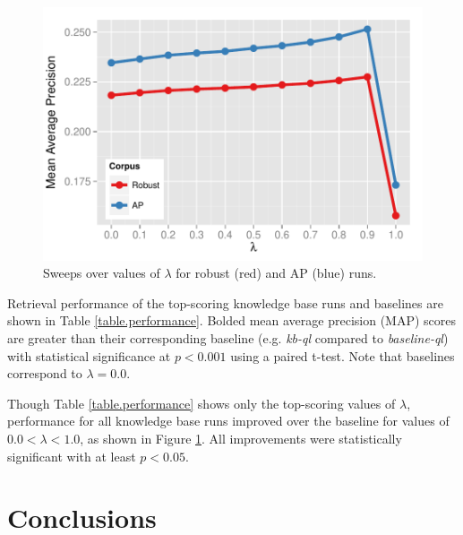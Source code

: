 \documentclass{sig-alternate}
\begin{document}
\begin{figure}
\centering
\includegraphics[width=\columnwidth]{figures/sweep-ql.pdf}
\caption{Sweeps over values of $\lambda$ for robust (red) and AP (blue) runs.}
\label{figure.sweeps-ql}
\end{figure}

Retrieval performance of the top-scoring knowledge base runs and baselines are shown in Table \ref{table.performance}. Bolded mean average precision (MAP) scores are greater than their corresponding baseline (e.g. \textit{kb-ql} compared to \textit{baseline-ql}) with statistical significance at $p < 0.001$ using a paired t-test. Note that baselines correspond to $\lambda = 0.0$. 

Though Table \ref{table.performance} shows only the top-scoring values of $\lambda$, performance for all knowledge base runs improved over the baseline for values of $0.0 < \lambda < 1.0$, as shown in Figure \ref{figure.sweeps-ql}. All improvements were statistically significant with at least $p < 0.05$.


\section{Conclusions}\label{section.conclusions}
\end{document}
